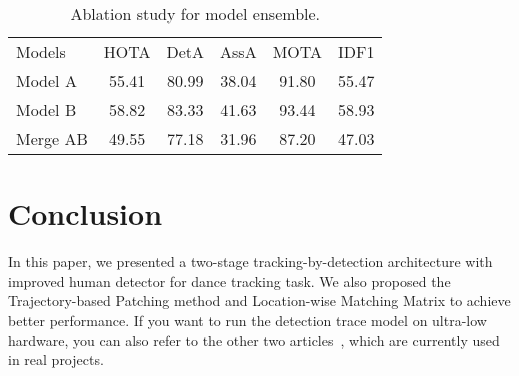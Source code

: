\documentclass[10pt,twocolumn,letterpaper]{article}
\begin{document}
\setlength{\tabcolsep}{4pt}
\begin{table}
\begin{center}
\caption{Ablation study for model ensemble.}
\label{table:model-merge}
\begin{tabular}{lccccc}
\hline\noalign{\smallskip}
Models & HOTA & DetA & AssA & MOTA & IDF1 \\
\noalign{\smallskip}
\hline
\noalign{\smallskip}
Model A & 55.41 & 80.99 & 38.04 & 91.80 & 55.47\\
Model B & 58.82 & 83.33 & 41.63 & 93.44 & 58.93\\
Merge AB  & 49.55 & 77.18 & 31.96 & 87.20 & 47.03\\
\hline
\end{tabular}
\end{center}
\end{table}
\setlength{\tabcolsep}{1.4pt}

\section{Conclusion}

In this paper, we presented a two-stage tracking-by-detection architecture with improved human detector for dance tracking task. We also proposed the Trajectory-based Patching method and Location-wise Matching Matrix to achieve better performance. If you want to run the detection trace model on ultra-low hardware, you can also refer to the other two articles~\cite{bai2019efficient}\cite{bai2020optimized}, which are currently used in real projects.


{\small


}
\end{document}
